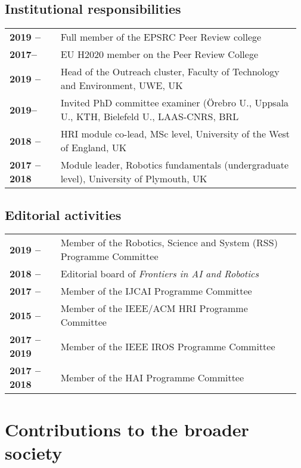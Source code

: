 \subsection{Institutional responsibilities}

\begin{tabular}{p{0.17\linewidth}p{0.8\linewidth}}
    \bf 2019 -- & Full member of the EPSRC Peer Review college \\
    \bf 2017-- & EU H2020 member on the Peer Review College \\
    \bf 2019 -- & Head of the Outreach cluster, Faculty of Technology and Environment, UWE, UK \\
    \bf 2019-- & Invited PhD committee examiner (Örebro U., Uppsala U., KTH,
    Bielefeld U., LAAS-CNRS, BRL \\
    \bf 2018 -- & HRI module co-lead, MSc level, University of the West of England, UK  \\
    \bf 2017 -- 2018 & Module leader, Robotics fundamentals (undergraduate level), University of Plymouth, UK \\
\end{tabular}

\subsection{Editorial activities}

\begin{tabular}{p{0.17\linewidth}p{0.8\linewidth}}
    \bf 2019 --  & Member of the Robotics, Science and System (RSS) Programme Committee  \\
    \bf 2018 --  & Editorial board of \emph{Frontiers in AI and Robotics} \\
    \bf 2017 --  & Member of the IJCAI Programme Committee  \\
    \bf 2015 --  & Member of the IEEE/ACM HRI Programme Committee \\
    \bf 2017 -- 2019 & Member of the IEEE IROS Programme Committee  \\
    \bf 2017 -- 2018 & Member of the HAI Programme Committee  \\
\end{tabular}

\vspace{2em}
\section{Contributions to the broader society}

